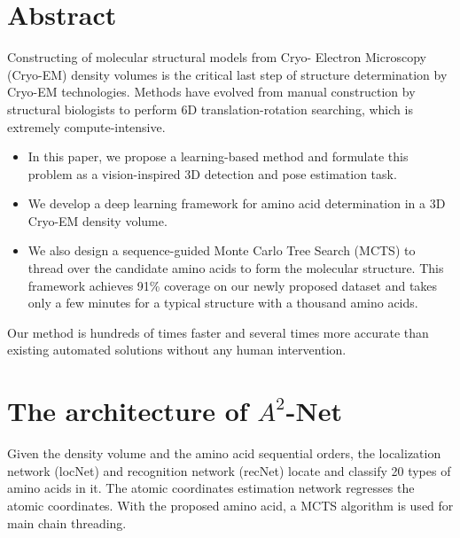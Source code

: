 \documentclass[final, xcolor=cmyk]{beamer}
\author{Kui Xu, Zhe Wang, Jianping Shi, Hongsheng Li, Qiangfeng Cliff Zhang}
\institute{School of Life Sciences, Tsinghua University}
\begin{document}
\begin{poster}
\newcolumn
\section{Abstract}
\justifying
Constructing of molecular structural models from Cryo- Electron Microscopy (Cryo-EM) density volumes is the critical last step of structure determination by Cryo-EM technologies. 
Methods have evolved from manual construction by structural biologists to perform 6D translation-rotation searching, which is extremely compute-intensive. 
\begin{itemize} 
    \justifying
    \item In this paper, we propose a learning-based method and formulate this problem as a vision-inspired 3D detection and pose estimation task. 
    \item We develop a deep learning framework for amino acid determination in a 3D Cryo-EM density volume. 
    \item We also design a sequence-guided Monte Carlo Tree Search (MCTS) to thread over the candidate amino acids to form the molecular structure. This framework achieves 91\% coverage on our newly proposed dataset and takes only a few minutes for a typical structure with a thousand amino acids. 
\end{itemize}
Our method is hundreds of times faster and several times more accurate than existing automated solutions without any human intervention.


\section{The architecture of $A^2$-Net}
\begin{figure}
\end{figure}
Given the density volume and the amino acid sequential orders, the localization network (locNet) and recognition network (recNet) locate and classify 20 types of amino acids in it. 
The atomic coordinates estimation network regresses the atomic coordinates. With the proposed amino acid, a MCTS algorithm is used for main chain threading.


\end{poster}
\end{document}
